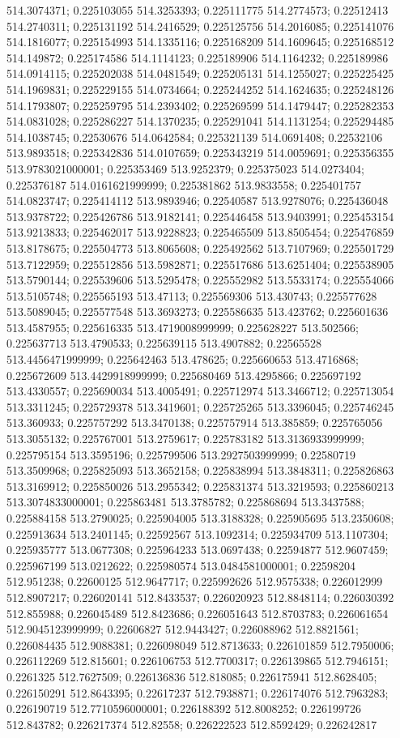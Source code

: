 514.3074371; 0.225103055 514.3253393; 0.225111775 514.2774573; 0.22512413 514.2740311; 0.225131192 514.2416529; 0.225125756 514.2016085; 0.225141076 514.1816077; 0.225154993 514.1335116; 0.225168209 514.1609645; 0.225168512 514.149872; 0.225174586 514.1114123; 0.225189906 514.1164232; 0.225189986 514.0914115; 0.225202038 514.0481549; 0.225205131 514.1255027; 0.225225425 514.1969831; 0.225229155 514.0734664; 0.225244252 514.1624635; 0.225248126 514.1793807; 0.225259795 514.2393402; 0.225269599 514.1479447; 0.225282353 514.0831028; 0.225286227 514.1370235; 0.225291041 514.1131254; 0.225294485 514.1038745; 0.22530676 514.0642584; 0.225321139 514.0691408; 0.22532106 513.9893518; 0.225342836 514.0107659; 0.225343219 514.0059691; 0.225356355 513.9783021000001; 0.225353469 513.9252379; 0.225375023 514.0273404; 0.225376187 514.0161621999999; 0.225381862 513.9833558; 0.225401757 514.0823747; 0.225414112 513.9893946; 0.22540587 513.9278076; 0.225436048 513.9378722; 0.225426786 513.9182141; 0.225446458 513.9403991; 0.225453154 513.9213833; 0.225462017 513.9228823; 0.225465509 513.8505454; 0.225476859 513.8178675; 0.225504773 513.8065608; 0.225492562 513.7107969; 0.225501729 513.7122959; 0.225512856 513.5982871; 0.225517686 513.6251404; 0.225538905 513.5790144; 0.225539606 513.5295478; 0.225552982 513.5533174; 0.225554066 513.5105748; 0.225565193 513.47113; 0.225569306 513.430743; 0.225577628 513.5089045; 0.225577548 513.3693273; 0.225586635 513.423762; 0.225601636 513.4587955; 0.225616335 513.4719008999999; 0.225628227 513.502566; 0.225637713 513.4790533; 0.225639115 513.4907882; 0.22565528 513.4456471999999; 0.225642463 513.478625; 0.225660653 513.4716868; 0.225672609 513.4429918999999; 0.225680469 513.4295866; 0.225697192 513.4330557; 0.225690034 513.4005491; 0.225712974 513.3466712; 0.225713054 513.3311245; 0.225729378 513.3419601; 0.225725265 513.3396045; 0.225746245 513.360933; 0.225757292 513.3470138; 0.225757914 513.385859; 0.225765056 513.3055132; 0.225767001 513.2759617; 0.225783182 513.3136933999999; 0.225795154 513.3595196; 0.225799506 513.2927503999999; 0.22580719 513.3509968; 0.225825093 513.3652158; 0.225838994 513.3848311; 0.225826863 513.3169912; 0.225850026 513.2955342; 0.225831374 513.3219593; 0.225860213 513.3074833000001; 0.225863481 513.3785782; 0.225868694 513.3437588; 0.225884158 513.2790025; 0.225904005 513.3188328; 0.225905695 513.2350608; 0.225913634 513.2401145; 0.22592567 513.1092314; 0.225934709 513.1107304; 0.225935777 513.0677308; 0.225964233 513.0697438; 0.22594877 512.9607459; 0.225967199 513.0212622; 0.225980574 513.0484581000001; 0.22598204 512.951238; 0.22600125 512.9647717; 0.225992626 512.9575338; 0.226012999 512.8907217; 0.226020141 512.8433537; 0.226020923 512.8848114; 0.226030392 512.855988; 0.226045489 512.8423686; 0.226051643 512.8703783; 0.226061654 512.9045123999999; 0.22606827 512.9443427; 0.226088962 512.8821561; 0.226084435 512.9088381; 0.226098049 512.8713633; 0.226101859 512.7950006; 0.226112269 512.815601; 0.226106753 512.7700317; 0.226139865 512.7946151; 0.2261325 512.7627509; 0.226136836 512.818085; 0.226175941 512.8628405; 0.226150291 512.8643395; 0.22617237 512.7938871; 0.226174076 512.7963283; 0.226190719 512.7710596000001; 0.226188392 512.8008252; 0.226199726 512.843782; 0.226217374 512.82558; 0.226222523 512.8592429; 0.226242817 